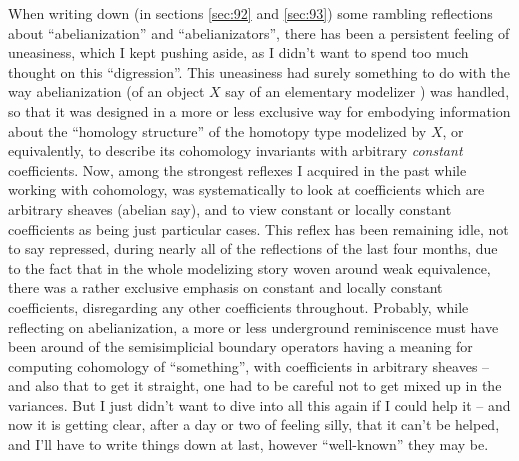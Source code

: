 \label{sec:99}%
When writing down (in sections \ref{sec:92} and \ref{sec:93}) some
rambling reflections about ``abelianization'' and ``abelianizators'',
there has been a persistent feeling of uneasiness, which I kept
pushing aside, as I didn't want to spend too much thought on this
``digression''. This uneasiness had surely something to do with the
way abelianization (of an object $X$ say of an elementary modelizer
\Ahat) was handled, so that it was designed in a more or less
exclusive way for embodying information about the ``homology
structure'' of the homotopy type modelized by $X$, or
equivalently, to describe its cohomology invariants with arbitrary
\emph{constant} coefficients. Now, among the strongest reflexes I
acquired in the past while working with cohomology, was systematically
to look at coefficients which are arbitrary sheaves (abelian say), and
to view constant or locally constant coefficients as being just
particular cases. This reflex has been remaining idle, not to say
repressed, during nearly all of the reflections of the last four
months, due to the fact that in the whole modelizing story woven
around weak equivalence, there was a rather exclusive emphasis on
constant and locally constant coefficients, disregarding any other
coefficients throughout. Probably, while reflecting on abelianization,
a more or less underground reminiscence must have been around of the
semisimplicial boundary operators having a meaning for computing
cohomology of ``something'', with coefficients in arbitrary sheaves --
and also that to get it straight, one had to be careful not to get
mixed up in the variances. But I just didn't want to dive into all
this again if I could help it -- and now it is getting clear, after a
day or two of feeling silly, that it can't be helped, and I'll have to
write things down at last, however ``well-known'' they may be.


